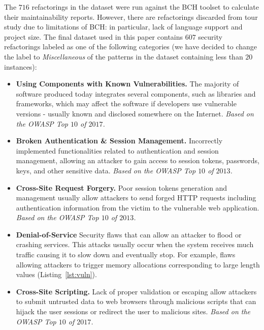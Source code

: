 \documentclass[10pt,conference]{IEEEtran}
\begin{document}
The $716$ refactorings in the dataset were run against the BCH toolset to
calculate their maintainability reports. However, there are refactorings
discarded from tour study due to limitations of BCH: in particular, lack of
language support and project size. The final dataset used in this paper contains
$607$ security refactorings labeled as one of the following categories (we
have decided to change the label to \textit{Miscellaneous} of the patterns in
the dataset containing less than $20$ instances):

\begin{itemize}
    \item \textbf{Using Components with Known Vulnerabilities.} The majority of
    software produced today integrates several components, such as libraries and
    frameworks, which may affect the software if developers use vulnerable
    versions - usually known and disclosed somewhere on the Internet.
    \textit{Based on the OWASP Top $10$ of $2017$.}

    \item \textbf{Broken Authentication \& Session Management.} Incorrectly
    implemented functionalities related to authentication and session
    management, allowing an attacker to gain access to session tokens,
    passwords, keys, and other sensitive data. \textit{Based on the OWASP Top
    $10$ of $2013$.}

    \item \textbf{Cross-Site Request Forgery.} Poor session tokens generation
    and management usually allow attackers to send forged HTTP requests
    including authentication information from the victim to the vulnerable web
    application. \textit{Based on the OWASP Top $10$ of $2013$.}

    \item \textbf{Denial-of-Service} Security flaws that can allow an attacker
    to flood or crashing services. This attacks usually occur when the system
    receives much traffic causing it to slow down and eventually stop. For
    example, flaws allowing attackers to trigger memory allocations
    corresponding to large length values (Listing~\ref{lst:vuln}).

    \item \textbf{Cross-Site Scripting.} Lack of proper validation or escaping
    allow attackers to submit untrusted data to web browsers through malicious
    scripts that can hijack the user sessions or redirect the user to malicious
    sites. \textit{Based on the OWASP Top $10$ of $2017$.}


\end{itemize}
\end{document}
